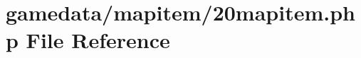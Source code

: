 \hypertarget{20mapitem_8php}{\section{gamedata/mapitem/20mapitem.php File Reference}
\label{20mapitem_8php}
}
